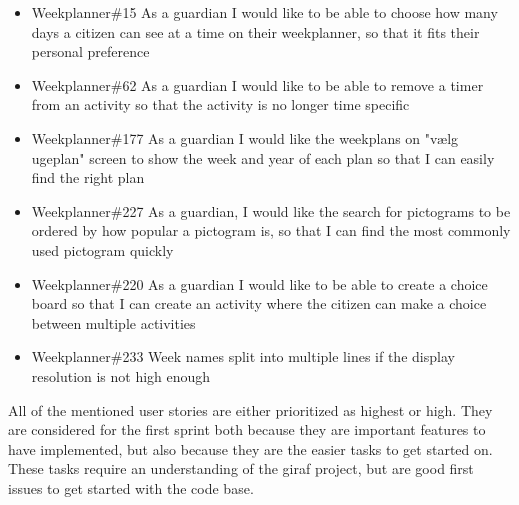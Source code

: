 \begin{itemize}
    \item Weekplanner\#15 As a guardian I would like to be able to choose how many days a citizen can see at a time on their weekplanner, so that it fits their personal preference 
    \item Weekplanner\#62 As a guardian I would like to be able to remove a timer from an activity so that the activity is no longer time specific
    \item Weekplanner\#177 As a guardian I would like the weekplans on "vælg ugeplan" screen to show the week and year of each plan so that I can easily find the right plan 
    \item Weekplanner\#227 As a guardian, I would like the search for pictograms to be ordered by how popular a pictogram is, so that I can find the most commonly used pictogram quickly
    \item Weekplanner\#220 As a guardian I would like to be able to create a choice board so that I can create an activity where the citizen can make a choice between multiple activities 
    \item Weekplanner\#233 Week names split into multiple lines if the display resolution is not high enough 
\end{itemize}
\noindent
All of the mentioned user stories are either prioritized as highest or high. 
They are considered for the first sprint both because they are important features to have implemented, but also because they are the easier tasks to get started on.
These tasks require an understanding of the giraf project, but are good first issues to get started with the code base.

